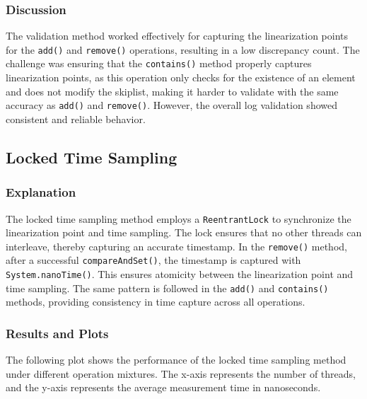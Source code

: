 \documentclass{article}
\begin{document}
\subsubsection{Discussion}
The validation method worked effectively for capturing the linearization points for the \texttt{add()} and \texttt{remove()} operations, resulting in a low discrepancy count. The challenge was ensuring that the \texttt{contains()} method properly captures linearization points, as this operation only checks for the existence of an element and does not modify the skiplist, making it harder to validate with the same accuracy as \texttt{add()} and \texttt{remove()}. However, the overall log validation showed consistent and reliable behavior.

\newpage
\subsection{Locked Time Sampling}

\subsubsection{Explanation}
The locked time sampling method employs a \texttt{ReentrantLock} to synchronize the linearization point and time sampling. The lock ensures that no other threads can interleave, thereby capturing an accurate timestamp. In the \texttt{remove()} method, after a successful \texttt{compareAndSet()}, the timestamp is captured with \texttt{System.nanoTime()}. This ensures atomicity between the linearization point and time sampling. The same pattern is followed in the \texttt{add()} and \texttt{contains()} methods, providing consistency in time capture across all operations.

\subsubsection{Results and Plots}

The following plot shows the performance of the locked time sampling method under different operation mixtures. The x-axis represents the number of threads, and the y-axis represents the average measurement time in nanoseconds.
\end{document}
